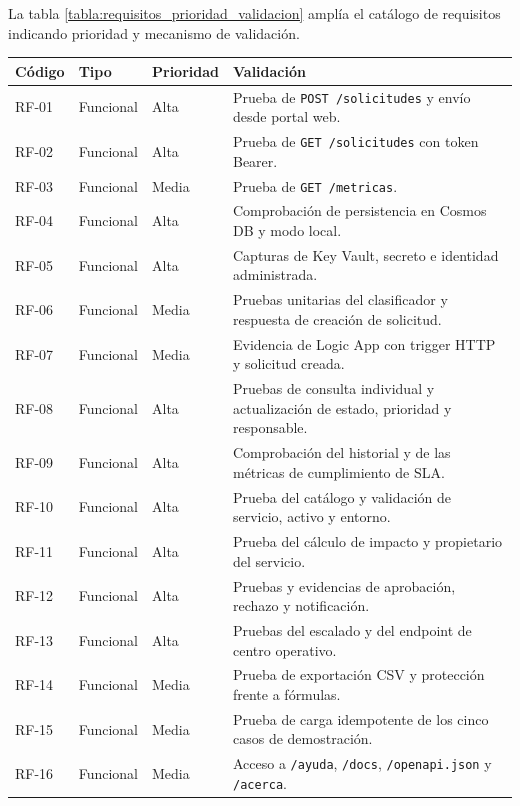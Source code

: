 La tabla \ref{tabla:requisitos_prioridad_validacion} amplía el catálogo de requisitos indicando prioridad y mecanismo de validación.

\begin{table}[h]
\centering
\scriptsize
\renewcommand{\arraystretch}{0.9}
\begin{tabularx}{\textwidth}{l l l X}
\textbf{Código} & \textbf{Tipo} & \textbf{Prioridad} & \textbf{Validación} \\
\hline
RF-01 & Funcional & Alta & Prueba de \texttt{POST /solicitudes} y envío desde portal web. \\
RF-02 & Funcional & Alta & Prueba de \texttt{GET /solicitudes} con token Bearer. \\
RF-03 & Funcional & Media & Prueba de \texttt{GET /metricas}. \\
RF-04 & Funcional & Alta & Comprobación de persistencia en Cosmos DB y modo local. \\
RF-05 & Funcional & Alta & Capturas de Key Vault, secreto e identidad administrada. \\
RF-06 & Funcional & Media & Pruebas unitarias del clasificador y respuesta de creación de solicitud. \\
RF-07 & Funcional & Media & Evidencia de Logic App con trigger HTTP y solicitud creada. \\
RF-08 & Funcional & Alta & Pruebas de consulta individual y actualización de estado, prioridad y responsable. \\
RF-09 & Funcional & Alta & Comprobación del historial y de las métricas de cumplimiento de SLA. \\
RF-10 & Funcional & Alta & Prueba del catálogo y validación de servicio, activo y entorno. \\
RF-11 & Funcional & Alta & Prueba del cálculo de impacto y propietario del servicio. \\
RF-12 & Funcional & Alta & Pruebas y evidencias de aprobación, rechazo y notificación. \\
RF-13 & Funcional & Alta & Pruebas del escalado y del endpoint de centro operativo. \\
RF-14 & Funcional & Media & Prueba de exportación CSV y protección frente a fórmulas. \\
RF-15 & Funcional & Media & Prueba de carga idempotente de los cinco casos de demostración. \\
RF-16 & Funcional & Media & Acceso a \texttt{/ayuda}, \texttt{/docs}, \texttt{/openapi.json} y \texttt{/acerca}. \\

\end{tabularx}
\end{table}
